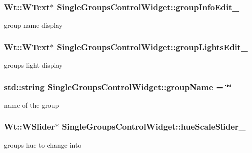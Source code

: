 \subsubsection[{\texorpdfstring{group\+Info\+Edit\+\_\+}{groupInfoEdit_}}]{\setlength{\rightskip}{0pt plus 5cm}Wt\+::\+W\+Text$\ast$ Single\+Groups\+Control\+Widget\+::group\+Info\+Edit\+\_\+\hspace{0.3cm}{\ttfamily [private]}}\hypertarget{classSingleGroupsControlWidget_a2b80c0e1b05f5c1086d89512342d206f}{}\label{classSingleGroupsControlWidget_a2b80c0e1b05f5c1086d89512342d206f}
group name display 
\subsubsection[{\texorpdfstring{group\+Lights\+Edit\+\_\+}{groupLightsEdit_}}]{\setlength{\rightskip}{0pt plus 5cm}Wt\+::\+W\+Text$\ast$ Single\+Groups\+Control\+Widget\+::group\+Lights\+Edit\+\_\+\hspace{0.3cm}{\ttfamily [private]}}\hypertarget{classSingleGroupsControlWidget_a0c5cd5692fc7b4be63b7732988021888}{}\label{classSingleGroupsControlWidget_a0c5cd5692fc7b4be63b7732988021888}
group\textquotesingle{}s light display 
\subsubsection[{\texorpdfstring{group\+Name}{groupName}}]{\setlength{\rightskip}{0pt plus 5cm}std\+::string Single\+Groups\+Control\+Widget\+::group\+Name = \char`\"{}\char`\"{}\hspace{0.3cm}{\ttfamily [private]}}\hypertarget{classSingleGroupsControlWidget_a39660eeffbb0d7a8f48409c561c2664c}{}\label{classSingleGroupsControlWidget_a39660eeffbb0d7a8f48409c561c2664c}
name of the group 
\subsubsection[{\texorpdfstring{hue\+Scale\+Slider\+\_\+}{hueScaleSlider_}}]{\setlength{\rightskip}{0pt plus 5cm}Wt\+::\+W\+Slider$\ast$ Single\+Groups\+Control\+Widget\+::hue\+Scale\+Slider\+\_\+\hspace{0.3cm}{\ttfamily [private]}}\hypertarget{classSingleGroupsControlWidget_adeb7eef1ab64cc98651ece9186e4dd68}{}\label{classSingleGroupsControlWidget_adeb7eef1ab64cc98651ece9186e4dd68}
group\textquotesingle{}s hue to change into 

